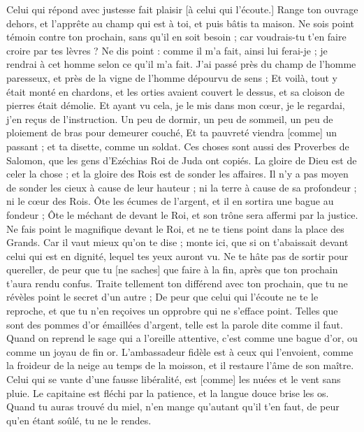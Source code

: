 \begin{multicols}{2}
Celui qui répond avec justesse fait plaisir [à celui qui l'écoute.]
Range ton ouvrage dehors, et l'apprête au champ qui est à toi, et puis bâtis ta maison.
Ne sois point témoin contre ton prochain, sans qu'il en soit besoin ; car voudrais-tu t'en faire croire par tes lèvres ?
Ne dis point : comme il m'a fait, ainsi lui ferai-je ; je rendrai à cet homme selon ce qu'il m'a fait.
J'ai passé près du champ de l'homme paresseux, et près de la vigne de l'homme dépourvu de sens ;
Et voilà, tout y était monté en chardons, et les orties avaient couvert le dessus, et sa cloison de pierres était démolie.
Et ayant vu cela, je le mis dans mon cœur, je le regardai, j'en reçus de l'instruction.
Un peu de dormir, un peu de sommeil, un peu de ploiement de bras pour demeurer couché,
Et ta pauvreté viendra [comme] un passant ; et ta disette, comme un soldat.
\VerseOne{}Ces choses sont aussi des Proverbes de Salomon, que les gens d'Ezéchias Roi de Juda ont copiés.
La gloire de Dieu est de celer la chose ; et la gloire des Rois est de sonder les affaires.
Il n'y a pas moyen de sonder les cieux à cause de leur hauteur ; ni la terre à cause de sa profondeur ; ni le cœur des Rois.
Ôte les écumes de l'argent, et il en sortira une bague au fondeur ;
Ôte le méchant de devant le Roi, et son trône sera affermi par la justice.
Ne fais point le magnifique devant le Roi, et ne te tiens point dans la place des Grands.
Car il vaut mieux qu'on te dise ; monte ici, que si on t'abaissait devant celui qui est en dignité, lequel tes yeux auront vu.
Ne te hâte pas de sortir pour quereller, de peur que tu [ne saches] que faire à la fin, après que ton prochain t'aura rendu confus.
Traite tellement ton différend avec ton prochain, que tu ne révèles point le secret d'un autre ;
De peur que celui qui l'écoute ne te le reproche, et que tu n'en reçoives un opprobre qui ne s'efface point.
Telles que sont des pommes d'or émaillées d'argent, telle est la parole dite comme il faut.
Quand on reprend le sage qui a l'oreille attentive, c'est comme une bague d'or, ou comme un joyau de fin or.
L'ambassadeur fidèle est à ceux qui l'envoient, comme la froideur de la neige au temps de la moisson, et il restaure l'âme de son maître.
Celui qui se vante d'une fausse libéralité, est [comme] les nuées et le vent sans pluie.
Le capitaine est fléchi par la patience, et la langue douce brise les os.
Quand tu auras trouvé du miel, n'en mange qu'autant qu'il t'en faut, de peur qu'en étant soûlé, tu ne le rendes.

\end{multicols}
